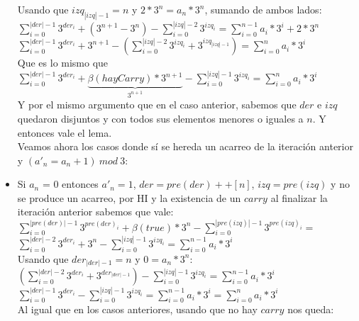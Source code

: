 \begin{itemize}
	Usando que $izq_{|izq|-1} = n$ y $ 2*3^{n} = a_{n}*3^{n}$, sumando de ambos lados:
	\\

	$\sum_{i=0}^{|der|-1} 3^{der_i} + (3^{n+1} - 3^{n}) - \sum_{i=0}^{|izq|-2} 3^{izq_i} = \sum_{i=0}^{n-1} a_i*3^{i} + 2*3^{n} $
	\\

	$\sum_{i=0}^{|der|-1} 3^{der_i} + 3^{n+1} - (\sum_{i=0}^{|izq|-2} 3^{izq_i} + 3^{izq_{|izq|-1}} ) = \sum_{i=0}^{n} a_i*3^{i}$
	\\

	Que es lo mismo que $\sum_{i=0}^{|der|-1} 3^{der_i} + \underbrace{\beta(hayCarry)*3^{n+1}}_\text{$3^{n+1}$} - \sum_{i=0}^{|izq|-1} 3^{izq_i} = \sum_{i=0}^{n} a_i*3^{i} $
	\\

	Y por el mismo argumento que en el caso anterior, sabemos que $der$ e $izq$ quedaron disjuntos y con todos sus elementos menores o iguales a $n$. Y entonces vale el lema.
	\\

	Veamos ahora los casos donde sí se hereda un acarreo de la iteración anterior y $(a'_n = a_n + 1)\ mod\ 3$:

	\item Si $a_n$ = 0 entonces $a'_n = 1$, $der = pre(der)++[n]$, $izq = pre(izq)$ y no se produce un acarreo, por HI y la existencia de un $carry$ al finalizar la iteración anterior sabemos que vale: \\

	$\sum_{i=0}^{|pre(der)|-1} 3^{pre(der)_i} + \beta(true)*3^{n} - \sum_{i=0}^{|pre(izq)|-1} 3^{pre(izq)_i} =$
	\\

	$\sum_{i=0}^{|der|-2} 3^{der_i} + 3^{n} - \sum_{i=0}^{|izq|-1} 3^{izq_i} = \sum_{i=0}^{n-1} a_i*3^{i} $
	\\

	Usando que $der_{|der|-1} = n$ y $ 0 = a_{n}*3^{n}$:
	\\

	$(\sum_{i=0}^{|der|-2} 3^{der_i} + 3^{der_{|der|-1}}) - \sum_{i=0}^{|izq|-1} 3^{izq_i} = \sum_{i=0}^{n-1} a_i*3^{i} $
	\\

	$\sum_{i=0}^{|der|-1} 3^{der_i} - \sum_{i=0}^{|izq|-1} 3^{izq_i} = \sum_{i=0}^{n-1} a_i*3^{i} =  \sum_{i=0}^{n} a_i*3^{i} $
	\\

	Al igual que en los casos anteriores, usando que no hay $carry$ nos queda: \\


\end{itemize}
